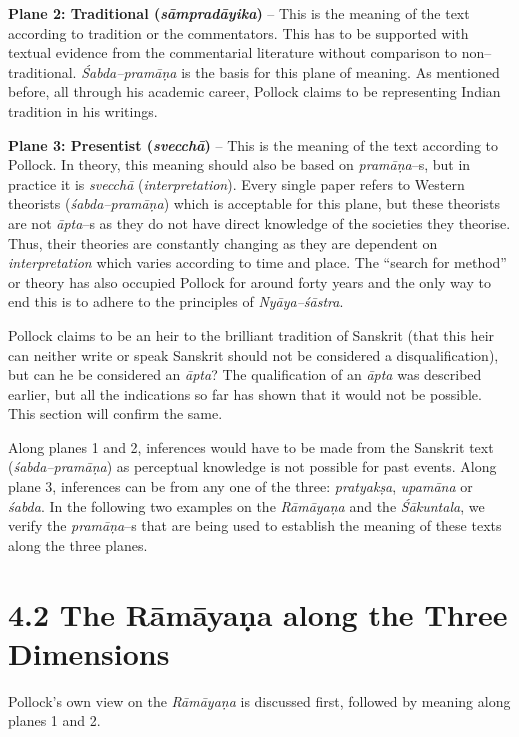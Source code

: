 \textbf{Plane 2: Traditional (\textit{sāmpradāyika})} – This is the meaning of the text according to tradition or the commentators. This has to be supported with textual evidence from the commentarial literature without comparison to non–traditional. \textit{Śabda–pramāṇa} is the basis for this plane of meaning. As mentioned before, all through his academic career, Pollock claims to be representing Indian tradition in his writings.

\textbf{Plane 3: Presentist (\textit{svecchā})} – This is the meaning of the text according to Pollock. In theory, this meaning should also be based on \textit{pramāṇa}–s, but in practice it is \textit{svecchā} (\textit{interpretation}). Every single paper refers to Western theorists (\textit{śabda–pramāṇa}) which is acceptable for this plane, but these theorists are not \textit{āpta}–s as they do not have direct knowledge of the societies they theorise. Thus, their theories are constantly changing as they are dependent on \textit{interpretation} which varies according to time and place. The “search for method” or theory has also occupied Pollock for around forty years and the only way to end this is to adhere to the principles of \textit{Nyāya–śāstra}.

Pollock claims to be an heir to the brilliant tradition of Sanskrit (that this heir can neither write or speak Sanskrit should not be considered a disqualification), but can he be considered an \textit{āpta}? The qualification of an \textit{āpta} was described earlier, but all the indications so far has shown that it would not be possible. This section will confirm the same.

Along planes 1 and 2, inferences would have to be made from the Sanskrit text (\textit{śabda–pramāṇa}) as perceptual knowledge is not possible for past events. Along plane 3, inferences can be from any one of the three: \textit{pratyakṣa}, \textit{upamāna }or \textit{śabda}. In the following two examples on the \textit{Rāmāyaṇa }and the \textit{Śākuntala}, we verify the \textit{pramāṇa}–s that are being used to establish the meaning of these texts along the three planes.


\section*{4.2 The Rāmāyaṇa along the Three Dimensions}

Pollock’s own view on the \textit{Rāmāyaṇa} is discussed first, followed by meaning along planes 1 and 2.

